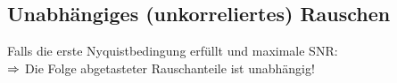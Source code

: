 \documentclass[fs, footer]{latex4ei}
\begin{document}
\begin{multicols*}{4}
	\subsection{Unabhängiges (unkorreliertes) Rauschen}
	Falls die erste Nyquistbedingung erfüllt und maximale SNR: \\ $\Rightarrow$ Die Folge abgetasteter Rauschanteile ist unabhängig!


\end{multicols*}

\end{document}
